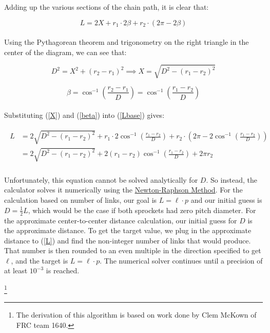 \documentclass[a4paper]{article}
\newcommand\blfootnote[1]{%
	\begingroup
	\renewcommand\thefootnote{}\footnote{#1}%
	\addtocounter{footnote}{-1}%
	\endgroup
}
\begin{document}
	Adding up the various sections of the chain path, it is clear that:
	
	\begin{equation} \label{Lbase}
		L = 2X + r_1 \cdot 2\beta + r_2 \cdot \left( 2\pi - 2\beta \right)
	\end{equation}\\
	
	Using the Pythagorean theorem and trigonometry on the right triangle in the center of the diagram, we can see that:
	
	\begin{equation} \label{X}
		D^2 = X^2 + \left( r_2 - r_1 \right)^2 \implies X = \sqrt{D^2 - \left( r_1 - r_2 \right)^2}
	\end{equation}
	
	\begin{equation} \label{beta}
		\beta = \cos^{-1} \left( \frac{r_2 - r_1}{D} \right) = \cos^{-1} \left( \frac{r_1 - r_2}{D} \right)
	\end{equation}\\
	
	Substituting (\ref{X}) and (\ref{beta}) into (\ref{Lbase}) gives:
	
	\begin{gather} \label{L}
	\begin{aligned}
		L &= 2 \sqrt{D^2 - (r_1 - r_2)^2} + r_1 \cdot 2 \cos^{-1} \left( \frac{r_1 - r_2}{D} \right) + r_2 \cdot \left( 2\pi - 2\cos^{-1} \left( \frac{r_1 - r_2}{D} \right) \right) \\
		&= 2 \sqrt{D^2 - \left( r_1 - r_2 \right)^2} + 2 \left( r_1 - r_2 \right) \cos^{-1} \left( \frac{r_1 - r_2}{D} \right) + 2\pi r_2
	\end{aligned}
	\end{gather}\\
	
	Unfortunately, this equation cannot be solved analytically for $ D $. So instead, the calculator solves it numerically using the \href{https://en.wikipedia.org/wiki/Newton\%27s_method}{Newton-Raphson Method}. For the calculation based on number of links, our goal is $ L = \ell \cdot p $ and our initial guess is $ D = \frac{1}{2} L $, which would be the case if both sprockets had zero pitch diameter. For the approximate center-to-center distance calculation, our initial guess for $ D $ is the approximate distance. To get the target value, we plug in the approximate distance to (\ref{L}) and find the non-integer number of links that would produce. That number is then rounded to an even multiple in the direction specified to get $ \ell $, and the target is $ L = \ell \cdot p $. The numerical solver continues until a precision of at least $ 10^{-3} $ is reached.
	
	\blfootnote{The derivation of this algorithm is based on work done by Clem McKown of FRC team 1640.}
	
	
\end{document}
